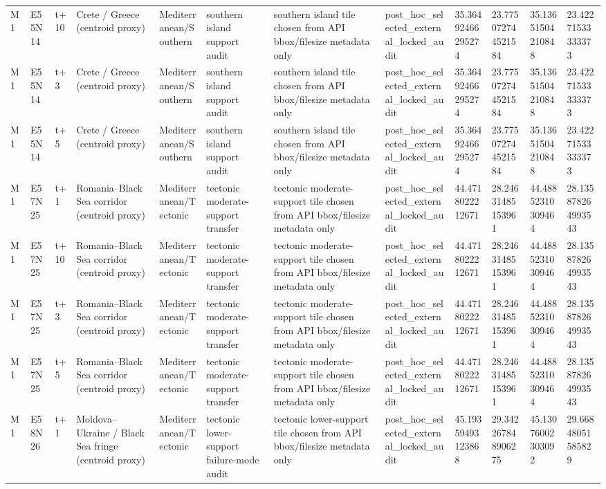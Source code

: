 \begin{landscape}
\begin{longtable}{llllllllllll}
M1 & E55N14 & t+10 & Crete / Greece (centroid proxy) & Mediterranean/Southern & southern island support audit & southern island tile chosen from API bbox/filesize metadata only & post\_hoc\_selected\_external\_locked\_audit & 35.36492466295274 & 23.775072744521584 & 35.13651504210848 & 23.42271533333373 \\
M1 & E55N14 & t+3 & Crete / Greece (centroid proxy) & Mediterranean/Southern & southern island support audit & southern island tile chosen from API bbox/filesize metadata only & post\_hoc\_selected\_external\_locked\_audit & 35.36492466295274 & 23.775072744521584 & 35.13651504210848 & 23.42271533333373 \\
M1 & E55N14 & t+5 & Crete / Greece (centroid proxy) & Mediterranean/Southern & southern island support audit & southern island tile chosen from API bbox/filesize metadata only & post\_hoc\_selected\_external\_locked\_audit & 35.36492466295274 & 23.775072744521584 & 35.13651504210848 & 23.42271533333373 \\
M1 & E57N25 & t+1 & Romania–Black Sea corridor (centroid proxy) & Mediterranean/Tectonic & tectonic moderate-support transfer & tectonic moderate-support tile chosen from API bbox/filesize metadata only & post\_hoc\_selected\_external\_locked\_audit & 44.4718022212671 & 28.24631485153961 & 44.48852310309464 & 28.135878264993543 \\
M1 & E57N25 & t+10 & Romania–Black Sea corridor (centroid proxy) & Mediterranean/Tectonic & tectonic moderate-support transfer & tectonic moderate-support tile chosen from API bbox/filesize metadata only & post\_hoc\_selected\_external\_locked\_audit & 44.4718022212671 & 28.24631485153961 & 44.48852310309464 & 28.135878264993543 \\
M1 & E57N25 & t+3 & Romania–Black Sea corridor (centroid proxy) & Mediterranean/Tectonic & tectonic moderate-support transfer & tectonic moderate-support tile chosen from API bbox/filesize metadata only & post\_hoc\_selected\_external\_locked\_audit & 44.4718022212671 & 28.24631485153961 & 44.48852310309464 & 28.135878264993543 \\
M1 & E57N25 & t+5 & Romania–Black Sea corridor (centroid proxy) & Mediterranean/Tectonic & tectonic moderate-support transfer & tectonic moderate-support tile chosen from API bbox/filesize metadata only & post\_hoc\_selected\_external\_locked\_audit & 44.4718022212671 & 28.24631485153961 & 44.48852310309464 & 28.135878264993543 \\
M1 & E58N26 & t+1 & Moldova–Ukraine / Black Sea fringe (centroid proxy) & Mediterranean/Tectonic & tectonic lower-support failure-mode audit & tectonic lower-support tile chosen from API bbox/filesize metadata only & post\_hoc\_selected\_external\_locked\_audit & 45.19359493123868 & 29.342267848906275 & 45.13076002303092 & 29.66848051585829 \\

\end{longtable}
\end{landscape}
